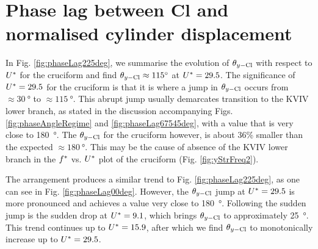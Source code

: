\documentclass[oneside]{utmthesis}
\begin{document}
\section{Phase lag between Cl and normalised cylinder displacement} \label{sec:phaseLag22500}
In Fig. \ref{fig:phaseLag225deg}, we summarise the evolution of $\theta_{y-\text{Cl}}$ with respect to $U^{*}$ for the \angtw{} cruciform and find $\plag \approx \SI{115}{\degree}$ at $U^{*} = 29.5$. The significance of $U^{*} = 29.5$ for the \angtw{} cruciform is that it is where a jump in $\theta_{y-\text{Cl}}$ occurs from $\approx \SI{30}{\degree}$ to $\approx \SI{115}{\degree}$. This abrupt jump usually demarcates transition to the KVIV lower branch, as stated in the discussion accompanying Figs. \ref{fig:phaseAngleRegime} and \ref{fig:phaseLag67545deg}, with a value that is very close to \SI{180}{\degree}. The $\theta_{y-\text{Cl}}$ for the \angtw{} cruciform however, is about 36\% smaller than the expected $\approx \SI{180}{\degree}$. This may be the cause of absence of the KVIV lower branch in the $f^{*}$ vs. $U^{*}$ plot of the \angtw{} cruciform (Fig. \ref{fig:yStrFreq2}).

The \angon{} arrangement produces a similar trend to Fig. \ref{fig:phaseLag225deg}, as one can see in Fig. \ref{fig:phaseLag00deg}. However, the $\theta_{y-\text{Cl}}$ jump at  $U^{*} =29.5$ is more pronounced and achieves a value very close to \SI{180}{\degree}. Following the sudden jump is the sudden drop at $U^{*} = 9.1$, which brings $\theta_{y-\text{Cl}}$ to approximately \SI{25}{\degree}. This trend continues up to $U^{*} = 15.9$, after which we find $\theta_{y-\text{Cl}}$ to monotonically increase up to $U^{*} = 29.5$.
\end{document}
